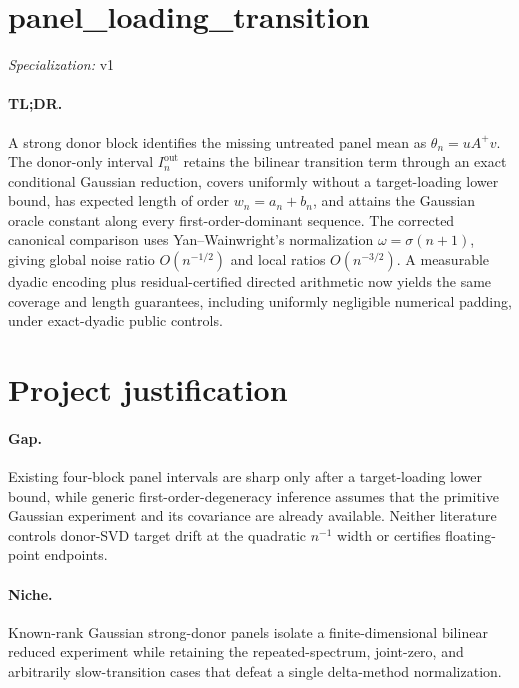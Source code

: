 \documentclass{article}
\begin{document}
\sloppy

\section*{panel\_\allowbreak{}loading\_\allowbreak{}transition}

\noindent\textit{Specialization:} v1\par

\paragraph{TL;DR.} A strong donor block identifies the missing untreated panel mean as \(\theta_n=uA^+v\). The donor-only interval \(I_n^{\mathrm{out}}\) retains the bilinear transition term through an exact conditional Gaussian reduction, covers uniformly without a target-loading lower bound, has expected length of order \(w_n=a_n+b_n\), and attains the Gaussian oracle constant along every first-order-dominant sequence. The corrected canonical comparison uses Yan--Wainwright's normalization \(\omega=\sigma(n+1)\), giving global noise ratio \(O(n^{-1/2})\) and local ratios \(O(n^{-3/2})\). A measurable dyadic encoding plus residual-certified directed arithmetic now yields the same coverage and length guarantees, including uniformly negligible numerical padding, under exact-dyadic public controls.

\section{Project justification}

\paragraph{Gap.} Existing four-block panel intervals are sharp only after a target-loading lower bound, while generic first-order-degeneracy inference assumes that the primitive Gaussian experiment and its covariance are already available. Neither literature controls donor-SVD target drift at the quadratic \(n^{-1}\) width or certifies floating-point endpoints.

\paragraph{Niche.} Known-rank Gaussian strong-donor panels isolate a finite-dimensional bilinear reduced experiment while retaining the repeated-spectrum, joint-zero, and arbitrarily slow-transition cases that defeat a single delta-method normalization.
\end{document}
